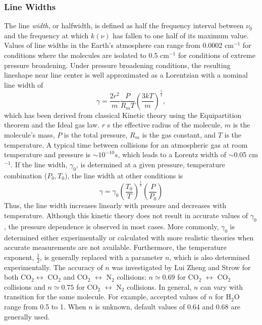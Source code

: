 \documentclass[11pt]{article}
\begin{document}
\subsubsection{Line Widths}

The line {\it width}, or halfwidth, is defined as half the frequency 
interval 
between $\nu_{0}$ and the frequency at which $k(\nu)$ has fallen to one
half of its maximum value.  Values of line widths in the Earth's atmosphere
can range from 0.0002 cm$^{-1}$ for
conditions where the molecules are isolated to 0.5 cm$^{-1}$ for conditions
of extreme pressure broadening.  Under pressure
broadening conditions, the resulting lineshape near line center is
well approximated as a Lorentzian with a nominal line width of
\begin{equation}
\gamma = \frac{2r^2}{m}\frac{P}{R_m T}
         \left(\frac{3kT}{m}\right)^{\frac{1}{2}},
\end{equation}
which has been derived from classical Kinetic theory using the 
Equipartition theorem and the Ideal gas law.  $r$ s the effective radius 
of the molecule,  $m$ is
the molecule's mass, $P$ is the total pressure, $R_m$ is the gas constant,
and $T$ is the temperature.  A typical time between collisions for
an atmospheric gas at room temperature and pressure is $\sim 10^{-10}s$,
which leads to a Lorentz width of $\sim$0.05 cm$^{-1}$.  
If the line width, $\gamma_0$, is determined at a given 
pressure, temperature combination ($P_0, T_0$), the line width at other 
conditions is
\begin{equation}
\gamma = \gamma_0\left(\frac{T_0}{T}\right)^{\frac{1}{2}}
         \left(\frac{P}{P_0}\right)
\end{equation}
Thus, the line width increases linearly with pressure and decreases with
temperature.   Although this kinetic theory does not result in accurate
values of $\gamma_0$, the pressure dependence is observed in most cases.
More commonly, $\gamma_0$ is determined either experimentally or
calculated with more realistic theories when accurate measurements are not
available.  Furthermore, the temperature exponent, $\frac{1}{2}$, is
generally replaced with a parameter $n$, which is also determined
experimentally. The accuracy of $n$ was
investigated by Lui Zheng and Strow \cite{lui:89} for both
CO$_{2}$$\leftrightarrow$ CO$_{2}$ and CO$_{2}$ $\leftrightarrow$ N$_{2}$
collisions: $n \simeq 0.69$ for CO$_{2}$ $\leftrightarrow$ CO$_{2}$
collisions and $n \simeq 0.75$ for CO$_{2}$ $\leftrightarrow$ N$_{2}$
collisions.  In general, $n$ can vary with transition for the same
molecule.  For example, accepted values of $n$ for H$_2$O 
range from 0.5 to 1.  When $n$ is unknown, default values of 0.64 and 0.68
are generally used.
\end{document}
